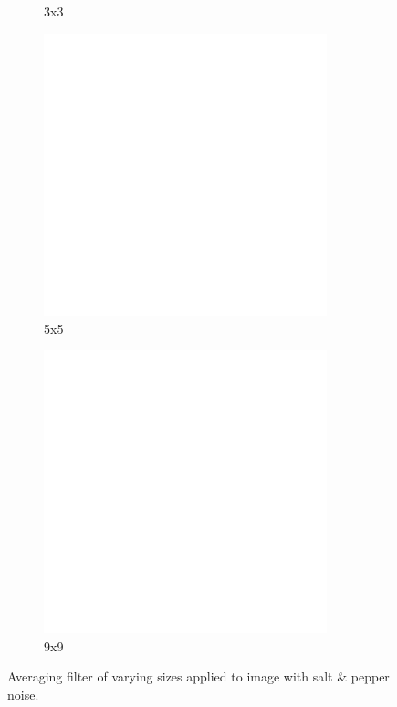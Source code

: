 \begin{figure}[h]
\begin{subfigure}[b]{0.3\textwidth}
        \caption{3x3}
        \label{fig:2-1-1:2}
    \end{subfigure}

    \begin{subfigure}[b]{0.3\textwidth}
        \includegraphics[width=0.9\textwidth]{../code/2_out/2-1_sp_5x5.png}
        \caption{5x5}
        \label{fig:2-1-1:3}
    \end{subfigure}
    \begin{subfigure}[b]{0.3\textwidth}
        \includegraphics[width=0.9\textwidth]{../code/2_out/2-1_sp_9x9.png}
        \caption{9x9}
        \label{fig:2-1-1:4}
    \end{subfigure}

    \caption{Averaging filter of varying sizes applied to image with salt \& pepper noise.}
    \label{fig:2-1-1}
\end{figure}


